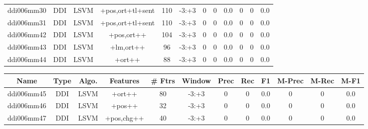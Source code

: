 \documentclass[a4paper]{article}
\begin{document}
\begin{landscape}
\begin{center}
\begin{tabular}{ |c|c|c|c|c|c|c|c|c|c|c|c|}
 
 	
 	\small{ ddi006mm30 } & \small{ DDI} & \small{  LSVM }  & +pos,ort+tl+sent  &  110 &  \small{  -3:+3 }  &  0 & 0 & 0.0  &  0 & 0 & 0.0 \\
 	

 
 	
 	\small{ ddi006mm31 } & \small{ DDI} & \small{  LSVM }  & +pos,ort+tl+sent  &  110 &  \small{  -3:+3 }  &  0 & 0 & 0.0  &  0 & 0 & 0.0 \\
 	

 
 	
 	\small{ ddi006mm42 } & \small{ DDI} & \small{  LSVM }  & +pos,ort++  &  104 &  \small{  -3:+3 }  &  0 & 0 & 0.0  &  0 & 0 & 0.0 \\
 	

 
 	
 	\small{ ddi006mm43 } & \small{ DDI} & \small{  LSVM }  & +lm,ort++  &  96 &  \small{  -3:+3 }  &  0 & 0 & 0.0  &  0 & 0 & 0.0 \\
 	

 
 	
 	\small{ ddi006mm44 } & \small{ DDI} & \small{  LSVM }  & +ort++  &  88 &  \small{  -3:+3 }  &  0 & 0 & 0.0  &  0 & 0 & 0.0 \\
 	
 \hline
\end{tabular}
\end{center}




\begin{center}
\begin{tabular}{ |c|c|c|c|c|c|c|c|c|c|c|c|} 
 \hline
 	Name & Type & Algo. & Features & \# Ftrs & Window & Prec & Rec & F1 & M-Prec & M-Rec & M-F1\\
 \hline

 	

 
 	
 	\small{ ddi006mm45 } & \small{ DDI} & \small{  LSVM }  & +ort++  &  80 &  \small{  -3:+3 }  &  0 & 0 & 0.0  &  0 & 0 & 0.0 \\
 	

 
 	
 	\small{ ddi006mm46 } & \small{ DDI} & \small{  LSVM }  & +pos++  &  32 &  \small{  -3:+3 }  &  0 & 0 & 0.0  &  0 & 0 & 0.0 \\
 	

 
 	
 	\small{ ddi006mm47 } & \small{ DDI} & \small{  LSVM }  & +pos,chg++  &  40 &  \small{  -3:+3 }  &  0 & 0 & 0.0  &  0 & 0 & 0.0 \\
 	


\end{tabular}
\end{center}
\end{landscape}
\end{document}
